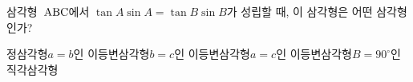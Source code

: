 삼각형~$\mathrm{ABC}$에서 $\tan A\sin A=\tan B\sin B$가 성립할 때, 이 삼각형은 어떤 삼각형인가?
\begin{choicesii}{정삼각형}{$a=b$인 이등변삼각형}{$b=c$인 이등변삼각형}{$a=c$인 이등변삼각형}{$B=90^\circ$인 직각삼각형}\end{choicesii}
